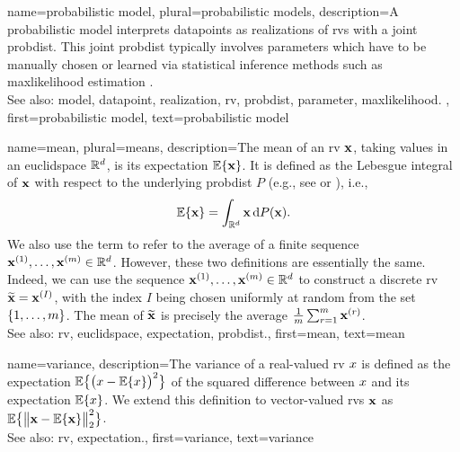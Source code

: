 {name={probabilistic model}, plural={probabilistic models},
	description={A probabilistic \gls{model} interprets \glspl{datapoint} 
		as \glspl{realization} of \glspl{rv} with a joint \gls{probdist}. This joint \gls{probdist} typically 
		involves \glspl{parameter} which have to be manually chosen or learned via statistical inference 
		methods such as \gls{maxlikelihood} estimation \cite{LC}.
					\\ 
		See also: \gls{model}, \gls{datapoint}, \gls{realization}, \gls{rv}, \gls{probdist}, \gls{parameter}, \gls{maxlikelihood}. }, 
	first={probabilistic model}, 
	text={probabilistic model} 
}


{name={mean}, plural={means},
	description={The  mean of an \gls{rv} ${\bf x}$, taking 
 		values in an \gls{euclidspace} $\mathbb{R}^{d}$, is its 
 		\gls{expectation} $\mathbb{E}\{{\bf x}\}$. It is defined as the Lebesgue 
 		integral of ${\bf x}$ with respect to the underlying \gls{probdist} $P$ (e.g., see \cite{RudinBookPrinciplesMatheAnalysis} or \cite{BillingsleyProbMeasure}), i.e.,
		\[
		\mathbb{E}\{{\bf x}\} = \int_{\mathbb{R}^{d}} {\bf x} \, \mathrm{d}P({\bf x}).
		\] 
		We also use the term to refer to the average of a finite sequence 
		${\bf x}^{(1)}, \ldots, {\bf x}^{(m)} \in \mathbb{R}^{d}$. However, 
		these two definitions are essentially the same. Indeed, we can use the sequence 
		${\bf x}^{(1)}, \ldots, {\bf x}^{(m)} \in \mathbb{R}^{d}$ to construct a 
		discrete \gls{rv} $\widetilde{{\bf x}}={\bf x}^{(I)}$, with the index $I$ being chosen uniformly 
		at random from the set $\{1,\ldots,m\}$. The mean of $\widetilde{{\bf x}}$ is 
		precisely the average $\frac{1}{m} \sum_{r=1}^{m} {\bf x}^{(r)}$.
			\\ 
		See also: \gls{rv}, \gls{euclidspace}, \gls{expectation}, \gls{probdist}.}, 
	first={mean}, 
	text={mean} 
}

{name={variance},
	description={The variance of a real-valued \gls{rv} $x$ is defined as the \gls{expectation} 
		$\mathbb{E}\big\{ \big( x - \mathbb{E}\{x \} \big)^{2} \big\}$ of the squared difference between $x$ 
		and its \gls{expectation} $\mathbb{E}\{x \}$. We extend this definition to vector-valued \glspl{rv} ${\bf x}$ 
		as $\mathbb{E}\big\{ \big\| {\bf x} - \mathbb{E}\{{\bf x} \} \big\|_{2}^{2} \big\}$.
					\\ 
		See also: \gls{rv}, \gls{expectation}.},
	first={variance},
	text={variance} 
}

